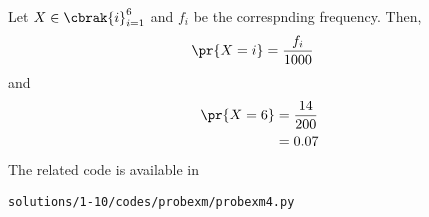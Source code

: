 Let $X \in \cbrak{i}_{i=1}^{6}$ and $f_i$ be the correspnding frequency.  Then, 
\begin{align}
\pr{X=i} &= \frac{f_i}{1000}
\end{align}
and
\begin{align} 
\pr{X=6} &= \frac{14}{200}
\\
&= 0.07
\end{align}
The related code is available in 
\begin{lstlisting}
solutions/1-10/codes/probexm/probexm4.py
\end{lstlisting}
